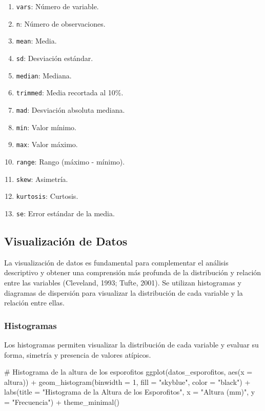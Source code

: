 \documentclass[
  spanish,
  a4paper,
  DIV=11,
  numbers=noendperiod,
  onepage,
  openany]{scrreprt}
\newenvironment{Shaded}{\begin{snugshade}}{\end{snugshade}}
\newcommand{\AttributeTok}[1]{\textcolor[rgb]{0.40,0.45,0.13}{#1}}
\newcommand{\CommentTok}[1]{\textcolor[rgb]{0.37,0.37,0.37}{#1}}
\newcommand{\DecValTok}[1]{\textcolor[rgb]{0.68,0.00,0.00}{#1}}
\newcommand{\FunctionTok}[1]{\textcolor[rgb]{0.28,0.35,0.67}{#1}}
\newcommand{\NormalTok}[1]{\textcolor[rgb]{0.00,0.23,0.31}{#1}}
\newcommand{\SpecialCharTok}[1]{\textcolor[rgb]{0.37,0.37,0.37}{#1}}
\newcommand{\StringTok}[1]{\textcolor[rgb]{0.13,0.47,0.30}{#1}}
\begin{document}
\begin{enumerate}
\def\labelenumi{\arabic{enumi}.}
\item
  \texttt{vars}: Número de variable.
\item
  \texttt{n}: Número de observaciones.
\item
  \texttt{mean}: Media.
\item
  \texttt{sd}: Desviación estándar.
\item
  \texttt{median}: Mediana.
\item
  \texttt{trimmed}: Media recortada al 10\%.
\item
  \texttt{mad}: Desviación absoluta mediana.
\item
  \texttt{min}: Valor mínimo.
\item
  \texttt{max}: Valor máximo.
\item
  \texttt{range}: Rango (máximo - mínimo).
\item
  \texttt{skew}: Asimetría.
\item
  \texttt{kurtosis}: Curtosis.
\item
  \texttt{se}: Error estándar de la media.
\end{enumerate}

\subsection{Visualización de Datos}\label{visualizaciuxf3n-de-datos-1}

La visualización de datos es fundamental para complementar el análisis
descriptivo y obtener una comprensión más profunda de la distribución y
relación entre las variables (Cleveland, 1993; Tufte, 2001). Se utilizan
histogramas y diagramas de dispersión para visualizar la distribución de
cada variable y la relación entre ellas.

\subsubsection{Histogramas}\label{histogramas-2}

Los histogramas permiten visualizar la distribución de cada variable y
evaluar su forma, simetría y presencia de valores atípicos.

\begin{Shaded}
\begin{Highlighting}[]
\CommentTok{\# Histograma de la altura de los esporofitos}
\FunctionTok{ggplot}\NormalTok{(datos\_esporofitos, }\FunctionTok{aes}\NormalTok{(}\AttributeTok{x =}\NormalTok{ altura)) }\SpecialCharTok{+}
  \FunctionTok{geom\_histogram}\NormalTok{(}\AttributeTok{binwidth =} \DecValTok{1}\NormalTok{, }\AttributeTok{fill =} \StringTok{"skyblue"}\NormalTok{, }\AttributeTok{color =} \StringTok{"black"}\NormalTok{) }\SpecialCharTok{+}
  \FunctionTok{labs}\NormalTok{(}\AttributeTok{title =} \StringTok{"Histograma de la Altura de los Esporofitos"}\NormalTok{,}
       \AttributeTok{x =} \StringTok{"Altura (mm)"}\NormalTok{,}
       \AttributeTok{y =} \StringTok{"Frecuencia"}\NormalTok{) }\SpecialCharTok{+}
  \FunctionTok{theme\_minimal}\NormalTok{()}
\end{Highlighting}
\end{Shaded}
\end{document}
